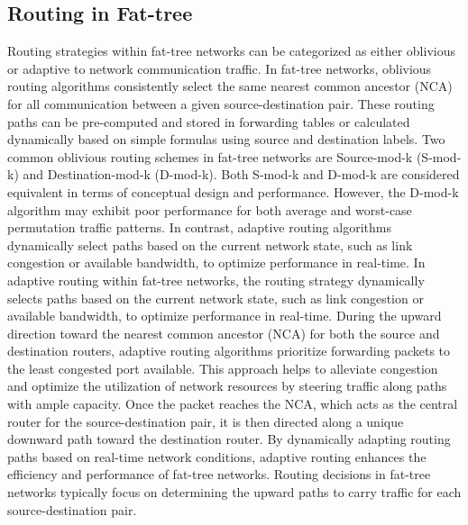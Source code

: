 \subsection{Routing in Fat-tree}
Routing strategies within fat-tree networks can be categorized as either oblivious or adaptive to network communication traffic. In fat-tree networks, oblivious routing algorithms consistently select the same nearest common ancestor (NCA) for all communication between a given source-destination pair. These routing paths can be pre-computed and stored in forwarding tables or calculated dynamically based on simple formulas using source and destination labels. Two common oblivious routing schemes in fat-tree networks are Source-mod-k (S-mod-k) and Destination-mod-k (D-mod-k). Both S-mod-k and D-mod-k are considered equivalent in terms of conceptual design and performance. However, the D-mod-k algorithm may exhibit poor performance for both average and worst-case permutation traffic patterns. In contrast, adaptive routing algorithms dynamically select paths based on the current network state, such as link congestion or available bandwidth, to optimize performance in real-time. In adaptive routing within fat-tree networks, the routing strategy dynamically selects paths based on the current network state, such as link congestion or available bandwidth, to optimize performance in real-time. During the upward direction toward the nearest common ancestor (NCA) for both the source and destination routers, adaptive routing algorithms prioritize forwarding packets to the least congested port available. This approach helps to alleviate congestion and optimize the utilization of network resources by steering traffic along paths with ample capacity. Once the packet reaches the NCA, which acts as the central router for the source-destination pair, it is then directed along a unique downward path toward the destination router. By dynamically adapting routing paths based on real-time network conditions, adaptive routing enhances the efficiency and performance of fat-tree networks. Routing decisions in fat-tree networks typically focus on determining the upward paths to carry traffic for each source-destination pair.

